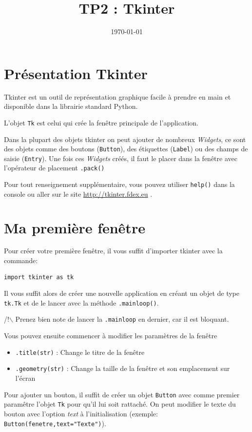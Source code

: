 \documentclass{article}
\date{\today}
\title{TP2 : Tkinter}
\begin{document}
\maketitle


\section{Présentation Tkinter}
\label{sec-1}
Tkinter est un outil de représentation graphique facile à prendre en main et disponible dans la librairie standard Python.

\noindent
L'objet \verb~Tk~ est celui qui crée la fenêtre principale de l'application.

\noindent
Dans la plupart des objets tkinter on peut ajouter de nombreux \emph{Widgets}, ce sont des objets comme des boutons (\verb~Button~), des étiquettes (\verb~Label~) ou des champs de saisie (\verb~Entry~).
Une fois ces \emph{Widgets} créés, il faut le placer dans la fenêtre avec l'opérateur de placement \verb~.pack()~

\noindent
Pour tout renseignement supplémentaire, vous pouvez utiliser \verb~help()~ dans la console ou aller sur le site \url{http://tkinter.fdex.eu} .

\section{Ma première fenêtre}
\label{sec-2}
Pour créer votre première fenêtre, il vous suffit d'importer tkinter avec la commande:
\begin{verbatim}
import tkinter as tk
\end{verbatim}

Il vous suffit alors de créer une nouvelle application en créant un objet de type \verb~tk.Tk~ et de le lancer avec la méthode \verb~.mainloop()~.

\noindent
/!$\backslash$ Prenez bien note de lancer la \verb~.mainloop~ en dernier, car il est bloquant.


\noindent
Vous pouvez ensuite commencer à modifier les paramètres de la fenêtre
\begin{itemize}
\item \verb~.title(str)~ : Change le titre de la fenêtre
\item \verb~.geometry(str)~ : Change la taille de la fenêtre et son emplacement sur l'écran
\end{itemize}

\noindent
Pour ajouter un bouton, il suffit de créer un objet \verb~Button~ avec comme premier paramêtre l'objet \verb~Tk~ pour qu'il lui soit rattaché.
On peut modifier le texte du bouton avec l'option \emph{text} à l'initialisation (exemple: \verb~Button(fenetre,text="Texte")~).
\end{document}
